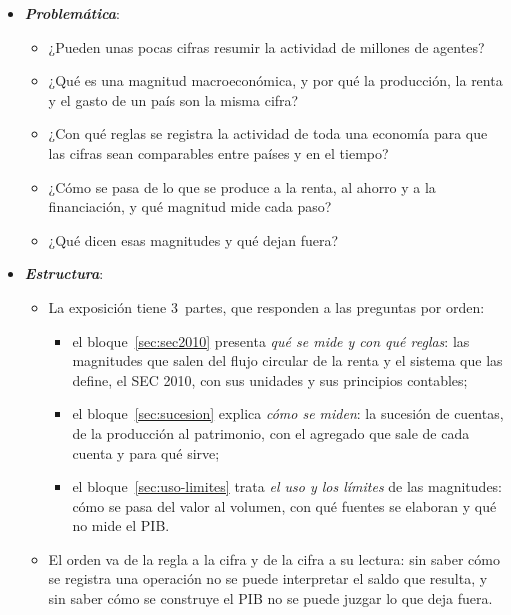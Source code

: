 \documentclass[11pt]{article}
\begin{document}
\begin{itemize}
\item \textbf{\emph{Problemática}}:
  \begin{itemize}
  \item ¿Pueden unas pocas cifras resumir la actividad de millones de agentes?
  \item ¿Qué es una magnitud macroeconómica, y por qué la producción, la renta y el gasto de un país son la misma cifra?
  \item ¿Con qué reglas se registra la actividad de toda una economía para que las cifras sean comparables entre países y en el tiempo?
  \item ¿Cómo se pasa de lo que se produce a la renta, al ahorro y a la financiación, y qué magnitud mide cada paso?
  \item ¿Qué dicen esas magnitudes y qué dejan fuera?
  \end{itemize}

\item \textbf{\emph{Estructura}}:
  \begin{itemize}
  \item La exposición tiene 3~partes, que responden a las preguntas por orden:
    \begin{itemize}
    \item el bloque~\ref{sec:sec2010} presenta \emph{qué se mide y con qué reglas}: las magnitudes que salen del flujo circular de la renta y el sistema que las define, el SEC 2010, con sus unidades y sus principios contables;
    \item el bloque~\ref{sec:sucesion} explica \emph{cómo se miden}: la sucesión de cuentas, de la producción al patrimonio, con el agregado que sale de cada cuenta y para qué sirve;
    \item el bloque~\ref{sec:uso-limites} trata \emph{el uso y los límites} de las magnitudes: cómo se pasa del valor al volumen, con qué fuentes se elaboran y qué no mide el PIB.
    \end{itemize}
  \item El orden va de la regla a la cifra y de la cifra a su lectura: sin saber cómo se registra una operación no se puede interpretar el saldo que resulta, y sin saber cómo se construye el PIB no se puede juzgar lo que deja fuera.
  \end{itemize}
\end{itemize}
\end{document}

